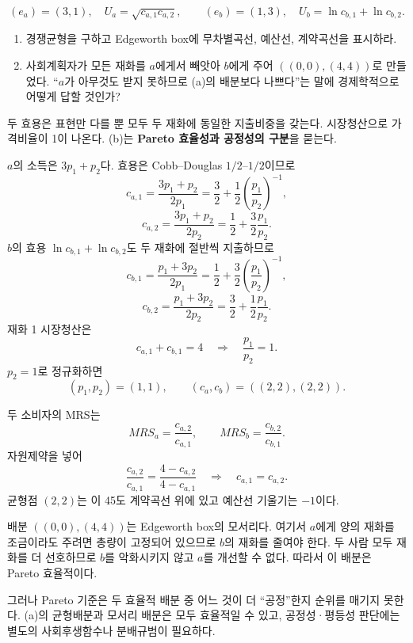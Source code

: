 \begin{officialbox}
\[
(e_a)=(3,1),\quad U_a=\sqrt{c_{a,1}c_{a,2}},
\qquad
(e_b)=(1,3),\quad U_b=\ln c_{b,1}+\ln c_{b,2}.
\]
\begin{enumerate}[label=(\alph*)]
\item 경쟁균형을 구하고 Edgeworth box에 무차별곡선, 예산선, 계약곡선을 표시하라.
\item 사회계획자가 모든 재화를 $a$에게서 빼앗아 $b$에게 주어 $((0,0),(4,4))$로 만들었다. ``$a$가 아무것도 받지 못하므로 (a)의 배분보다 나쁘다''는 말에 경제학적으로 어떻게 답할 것인가?
\end{enumerate}
\end{officialbox}

\begin{strategybox}
두 효용은 표현만 다를 뿐 모두 두 재화에 동일한 지출비중을 갖는다. 시장청산으로 가격비율이 1이 나온다. (b)는 \textbf{Pareto 효율성과 공정성의 구분}을 묻는다.
\end{strategybox}

\begin{solutionbox}
$a$의 소득은 $3p_1+p_2$다. 효용은 Cobb--Douglas $1/2$--$1/2$이므로
\[
c_{a,1}=\frac{3p_1+p_2}{2p_1}
=\frac32+\frac12\left(\frac{p_1}{p_2}\right)^{-1},
\]
\[
c_{a,2}=\frac{3p_1+p_2}{2p_2}
=\frac12+\frac32\frac{p_1}{p_2}.
\]
$b$의 효용 $\ln c_{b,1}+\ln c_{b,2}$도 두 재화에 절반씩 지출하므로
\[
c_{b,1}=\frac{p_1+3p_2}{2p_1}
=\frac12+\frac32\left(\frac{p_1}{p_2}\right)^{-1},
\]
\[
c_{b,2}=\frac{p_1+3p_2}{2p_2}
=\frac32+\frac12\frac{p_1}{p_2}.
\]
재화 1 시장청산은
\[
c_{a,1}+c_{b,1}=4
\quad\Longrightarrow\quad \frac{p_1}{p_2}=1.
\]
$p_2=1$로 정규화하면
\[
(p_1,p_2)=(1,1),\qquad (c_a,c_b)=((2,2),(2,2)).
\]

두 소비자의 MRS는
\[
MRS_a=\frac{c_{a,2}}{c_{a,1}},
\qquad
MRS_b=\frac{c_{b,2}}{c_{b,1}}.
\]
자원제약을 넣어
\[
\frac{c_{a,2}}{c_{a,1}}
=\frac{4-c_{a,2}}{4-c_{a,1}}
\quad\Longrightarrow\quad
\boxed{c_{a,1}=c_{a,2}}.
\]
균형점 $(2,2)$는 이 45도 계약곡선 위에 있고 예산선 기울기는 $-1$이다.

배분 $((0,0),(4,4))$는 Edgeworth box의 모서리다. 여기서 $a$에게 양의 재화를 조금이라도 주려면 총량이 고정되어 있으므로 $b$의 재화를 줄여야 한다. 두 사람 모두 재화를 더 선호하므로 $b$를 악화시키지 않고 $a$를 개선할 수 없다. 따라서 이 배분은 Pareto 효율적이다.

그러나 Pareto 기준은 두 효율적 배분 중 어느 것이 더 ``공정''한지 순위를 매기지 못한다. (a)의 균형배분과 모서리 배분은 모두 효율적일 수 있고, 공정성·평등성 판단에는 별도의 사회후생함수나 분배규범이 필요하다.
\end{solutionbox}

